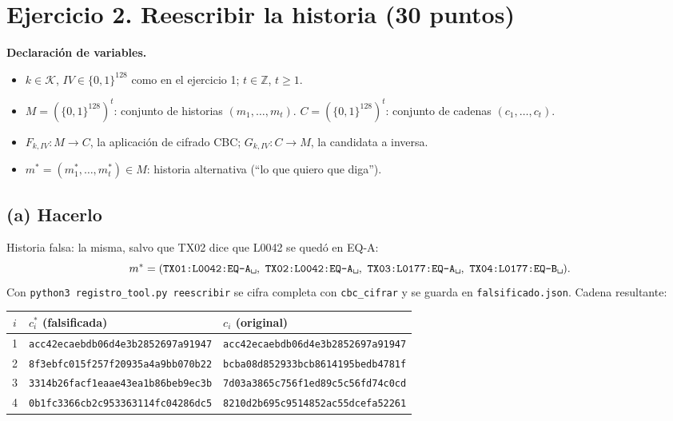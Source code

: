 \documentclass[11pt,letterpaper]{article}
\newcommand{\B}{\{0,1\}^{128}}
\newenvironment{declaracion}{\par\medskip\noindent\textbf{Declaración de variables.}\begin{itemize}[leftmargin=1.5em,itemsep=1pt]}{\end{itemize}}
\begin{document}
\section{Ejercicio 2. Reescribir la historia \hfill (30 puntos)}

\begin{declaracion}
  \item $k\in\mathcal{K}$, $IV\in\B$ como en el ejercicio 1; $t\in\mathbb{Z}$, $t\ge 1$.
  \item $M = (\B)^t$: conjunto de historias $(m_1,\dots,m_t)$. $C=(\B)^t$: conjunto de cadenas $(c_1,\dots,c_t)$.
  \item $F_{k,IV}: M\to C$, la aplicación de cifrado CBC; $G_{k,IV}: C\to M$, la candidata a inversa.
  \item $m^* = (m_1^*,\dots,m_t^*)\in M$: historia alternativa (``lo que quiero que diga'').
\end{declaracion}

\subsection*{(a) Hacerlo}

Historia falsa: la misma, salvo que TX02 dice que L0042 se quedó en EQ-A:
\[
m^* = (\texttt{TX01:L0042:EQ-A\textvisiblespace},\ \texttt{TX02:L0042:EQ-A\textvisiblespace},\ \texttt{TX03:L0177:EQ-A\textvisiblespace},\ \texttt{TX04:L0177:EQ-B\textvisiblespace}).
\]
Con \texttt{python3 registro\_tool.py reescribir} se cifra completa con \texttt{cbc\_cifrar} y se
guarda en \texttt{falsificado.json}. Cadena resultante:

\begin{center}
\small
\begin{tabular}{cll}
\toprule
$i$ & $c_i^*$ (falsificada) & $c_i$ (original) \\
\midrule
1 & \texttt{acc42ecaebdb06d4e3b2852697a91947} & \texttt{acc42ecaebdb06d4e3b2852697a91947} \\
2 & \texttt{8f3ebfc015f257f20935a4a9bb070b22} & \texttt{bcba08d852933bcb8614195bedb4781f} \\
3 & \texttt{3314b26facf1eaae43ea1b86beb9ec3b} & \texttt{7d03a3865c756f1ed89c5c56fd74c0cd} \\
4 & \texttt{0b1fc3366cb2c953363114fc04286dc5} & \texttt{8210d2b695c9514852ac55dcefa52261} \\
\bottomrule
\end{tabular}
\end{center}
\end{document}
